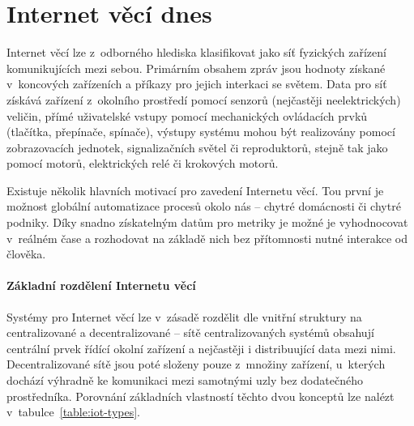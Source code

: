 \chapter{Internet věcí dnes}
\label{ch:principy-iot}
Internet věcí lze z~odborného hlediska klasifikovat jako síť fyzických zařízení komunikujících mezi sebou.
Primárním obsahem zpráv jsou hodnoty získané v~koncových zařízeních a příkazy pro jejich interkaci se světem.
Data pro síť získává zařízení z~okolního prostředí pomocí senzorů (nejčastěji neelektrických) veličin, přímé
uživatelské vstupy pomocí mechanických ovládacích prvků (tlačítka, přepínače, spínače), výstupy systému mohou být
realizovány pomocí zobrazovacích jednotek, signalizačních světel či reproduktorů, stejně tak jako pomocí motorů,
elektrických relé či krokových motorů.

Existuje několik hlavních motivací pro zavedení Internetu věcí.
Tou první je možnost globální automatizace procesů okolo nás -- chytré domácnosti či chytré podniky.
Díky snadno získatelným datům pro metriky je možné je vyhodnocovat v~reálném čase a rozhodovat na základě nich bez
přítomnosti nutné interakce od člověka.

\subsubsection{Základní rozdělení Internetu věcí}
Systémy pro Internet věcí lze v~zásadě rozdělit dle vnitřní struktury na centralizované a decentralizované --
sítě centralizovaných systémů obsahují centrální prvek řídící okolní zařízení a nejčastěji i distribuující data mezi
nimi.
Decentralizované sítě jsou poté složeny pouze z~množiny zařízení, u~kterých dochází výhradně ke komunikaci mezi
samotnými uzly bez dodatečného prostředníka.
Porovnání základních vlastností těchto dvou konceptů lze nalézt v~tabulce~\ref{table:iot-types}.

